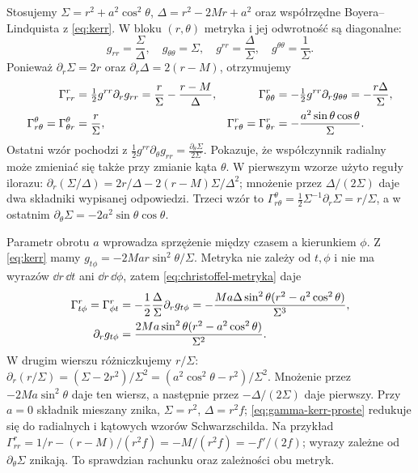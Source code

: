 \begin{przyklad}
\label{prz:koneksja-kerr}
Stosujemy $\Sigma=r^2+a^2\cos^2\theta$,
$\Delta=r^2-2Mr+a^2$ oraz współrzędne
Boyera--Lindquista z \eqref{eq:kerr}.
W bloku $(r,\theta)$ metryka i jej odwrotność
są diagonalne:
\[
 g_{rr}=\frac{\Sigma}{\Delta},\quad
 g_{\theta\theta}=\Sigma,\quad
 g^{rr}=\frac{\Delta}{\Sigma},\quad
 g^{\theta\theta}=\frac1\Sigma.
\]
Ponieważ $\partial_r\Sigma=2r$ oraz
$\partial_r\Delta=2(r-M)$, otrzymujemy
\begin{align}\label{eq:gamma-kerr-proste}
 \Gamma^r_{rr}
   &=\tfrac12g^{rr}\partial_rg_{rr}
     =\frac r\Sigma-\frac{r-M}{\Delta},
 & \Gamma^r_{\theta\theta}
   &=-\tfrac12g^{rr}\partial_rg_{\theta\theta}
     =-\frac{r\Delta}{\Sigma},\notag\\
 \Gamma^\theta_{r\theta}
  =\Gamma^\theta_{\theta r}&=\frac r\Sigma,
 &\Gamma^r_{r\theta}
  =\Gamma^r_{\theta r}
  &=-\frac{a^2\sin\theta\cos\theta}{\Sigma}.
\end{align}
Ostatni wzór pochodzi z
$\frac12 g^{rr}\partial_\theta g_{rr}
=\frac{\partial_\theta\Sigma}{2\Sigma}$.
Pokazuje, że współczynnik radialny może
zmieniać się także przy zmianie kąta $\theta$.
W pierwszym wzorze użyto reguły ilorazu:
$\partial_r(\Sigma/\Delta)
=2r/\Delta-2(r-M)\Sigma/\Delta^2$;
mnożenie przez $\Delta/(2\Sigma)$ daje dwa składniki
wypisanej odpowiedzi.
Trzeci wzór to
$\Gamma^\theta_{r\theta}
=\tfrac12\Sigma^{-1}\partial_r\Sigma=r/\Sigma$,
a w ostatnim
$\partial_\theta\Sigma=-2a^2\sin\theta\cos\theta$.

Parametr obrotu $a$ wprowadza sprzężenie
między czasem a kierunkiem $\phi$.
Z \eqref{eq:kerr} mamy
$g_{t\phi}=-2Mar\sin^2\theta/\Sigma$.
Metryka nie zależy od $t,\phi$ i nie ma
wyrazów $\dd r\,\dd t$ ani $\dd r\,\dd\phi$,
zatem \eqref{eq:christoffel-metryka} daje
\begin{align}\label{eq:gamma-kerr-mieszany}
 \Gamma^r_{t\phi}=\Gamma^r_{\phi t}
 &=-\frac12\frac\Delta\Sigma\partial_rg_{t\phi}
  =-\frac{Ma\Delta\sin^2\theta
                (r^2-a^2\cos^2\theta)}{\Sigma^3},\notag\\
 \partial_rg_{t\phi}
 &=\frac{2Ma\sin^2\theta
                (r^2-a^2\cos^2\theta)}{\Sigma^2}.
\end{align}
W drugim wierszu różniczkujemy $r/\Sigma$:
$\partial_r(r/\Sigma)=(\Sigma-2r^2)/\Sigma^2
=(a^2\cos^2\theta-r^2)/\Sigma^2$.
Mnożenie przez $-2Ma\sin^2\theta$ daje ten wiersz,
a następnie przez $-\Delta/(2\Sigma)$ daje pierwszy.
Przy $a=0$ składnik mieszany znika,
$\Sigma=r^2$, $\Delta=r^2f$;
\eqref{eq:gamma-kerr-proste} redukuje się
do radialnych i kątowych wzorów Schwarzschilda.
Na przykład
$\Gamma^r_{rr}=1/r-(r-M)/(r^2f)
=-M/(r^2f)=-f'/(2f)$;
wyrazy zależne od $\partial_\theta\Sigma$ znikają.
To sprawdzian rachunku oraz zależności obu metryk.
\end{przyklad}

